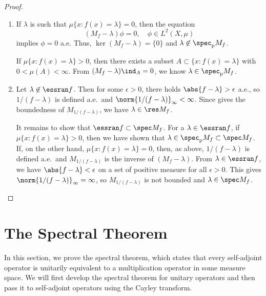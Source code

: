\documentclass[oneside,reqno,letterpaper]{amsart}
\newcommand{\pspec}{\spec_{\mathrm{p}}}
\begin{document}
\begin{proof}~
\begin{enumerate}[label=(\alph*)]
  \item %
  If \(\lambda\) is such that \(\mu \{x: f(x) = \lambda\} = 0\), then the equation
  \[
    (M_f - \lambda) \phi = 0, \quad \phi \in L^2(X, \mu)
  \] 
  implies \(\phi = 0\) a.e.
  Thus, \(\ker(M_f - \lambda) = \{0\}\) and \(\lambda \not\in \pspec M_f\). 

  If \(\mu \{x: f(x) = \lambda\} > 0\), then there exists a subset \(A \subset \{x: f(x) = \lambda\}\) with \(0 < \mu(A) < \infty\). 
  From \((M_f - \lambda) \ind_{A} = 0\), we know \(\lambda \in \pspec M_f\). 

  \item %
  Let \(\lambda \not\in \essran f\). 
  Then for some \(\epsilon > 0\), there holds \(\abs{f - \lambda} > \epsilon\) a.e., so \(1 / (f - \lambda)\) is defined a.e.\ and \(\norm{1 / (f - \lambda)}_{\infty} < \infty\). 
  Since  gives the boundedness of \(M_{1 / (f - \lambda)}\), we have \(\lambda \in \res M_f\). 

  It remains to show that \(\essran f \subset \spec M_f\). 
  For a \(\lambda \in \essran f\), if \(\mu \{x: f(x) = \lambda\} > 0\), then we have shown that \(\lambda \in \pspec M_f \subset \spec M_f\). 
  If, on the other hand, \(\mu \{x: f(x) = \lambda\} = 0\), then, as above, \(1 / (f - \lambda)\) is defined a.e.\ and \(M_{1 / (f - \lambda)}\) is the inverse of \((M_f - \lambda)\). 
  From \(\lambda \in \essran f\), we have \(\abs{f - \lambda} < \epsilon\) on a set of positive measure for all \(\epsilon > 0\). 
  This gives \(\norm{1 / (f - \lambda)}_{\infty} = \infty\), 
  so \(M_{1 / (f - \lambda)}\) is not bounded and \(\lambda \in \spec M_f\). 
\end{enumerate}
\end{proof}



\section{The Spectral Theorem}
\label{sec:spectral-thm}

In this section, we prove the spectral theorem, which states that every self-adjoint operator is unitarily equivalent to a multiplication operator in some measure space. 
We will first develop the spectral theorem for unitary operators and then pass it to self-adjoint operators using the Cayley transform.
\end{document}
